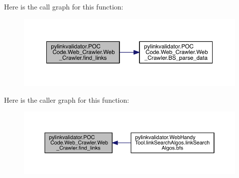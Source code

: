 Here is the call graph for this function\+:
\nopagebreak
\begin{figure}[H]
\begin{center}
\leavevmode
\includegraphics[width=350pt]{classpylinkvalidator_1_1_p_o_c_01_code_1_1_web___crawler_1_1_web___crawler_a77d0c8f8dad271699c5c26a65c127767_cgraph}
\end{center}
\end{figure}




Here is the caller graph for this function\+:
\nopagebreak
\begin{figure}[H]
\begin{center}
\leavevmode
\includegraphics[width=350pt]{classpylinkvalidator_1_1_p_o_c_01_code_1_1_web___crawler_1_1_web___crawler_a77d0c8f8dad271699c5c26a65c127767_icgraph}
\end{center}
\end{figure}


